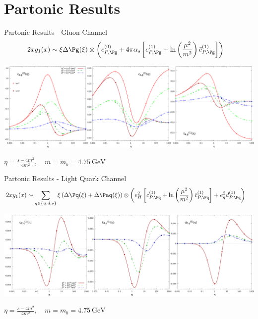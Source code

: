\section{Partonic Results}
\begin{frame}{Partonic Results - Gluon Channel}
\begin{align}
2xg_1(x) &\sim \xi\Delta \Pg(\xi) \otimes \left(c_{P,\Pg}^{(0)} + 4\pi\alpha_s\left[c_{P,\Pg}^{(1)} + \ln\left(\frac{\mu^2}{m^2}\right)\bar c_{P,\Pg}^{(1)}\right]\right)
\end{align}
\begin{center}
\includegraphics[width=\textwidth]{img/cgTP}
\end{center}
$\eta = \frac{s-4m^2}{4m^2},\quad m=m_b=\SI{4.75}{\GeV}$
\end{frame}

\begin{frame}{Partonic Results - Light Quark Channel}
\begin{align}
2xg_1(x) &\sim \sum_{q\in\{u,d,s\}}\xi\left(\Delta \Pq(\xi)+\Delta \Paq(\xi)\right) \otimes \left(e_H^2\left[c_{P,\Pq}^{(1)} + \ln\left(\frac{\mu^2}{m^2}\right)\bar c_{P,\Pq}^{(1)}\right] + e_q^2 d_{P,\Pq}^{(1)}\right)
\end{align}
\begin{center}
\includegraphics[width=\textwidth]{img/cdqP}
\end{center}
$\eta = \frac{s-4m^2}{4m^2},\quad m=m_b=\SI{4.75}{\GeV}$
\end{frame}
